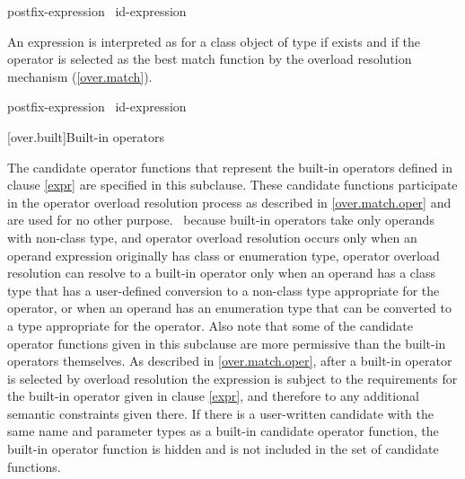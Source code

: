 \documentclass[american]{book}
\begin{document}
\begin{ncsimplebnf}
postfix-expression \terminal{->}\ id-expression
\end{ncsimplebnf}

An expression
is interpreted as
for a class object
of type
if
exists and if the operator is selected as the best match function by
the overload resolution mechanism (\ref{over.match}).

\pnum
{}%

\color{addclr}
\begin{ncsimplebnf}
postfix-expression \terminal{->}\ id-expression
\end{ncsimplebnf}
\color{black}


\setcounter{section}{5}
[over.built]{Built-in operators}

\pnum
The candidate operator functions that represent the built-in operators
defined in clause \ref{expr} are specified in this subclause.
These candidate
functions participate in the operator overload resolution process as
described in \ref{over.match.oper} and are used for no other purpose.
\enternote\ 
because built-in operators take only operands with non-class type,
and operator overload resolution occurs only when an operand expression
originally has class or enumeration type,
operator overload resolution can resolve to a built-in operator only
when an operand has a class type that has a user-defined conversion to
a non-class type appropriate for the operator, or when an operand has
an enumeration type that can be converted to a type appropriate
for the operator.
Also note that some of the candidate operator functions given in this subclause are
more permissive than the built-in operators themselves.
As
described in \ref{over.match.oper}, after a built-in operator is selected
by overload resolution the expression is subject to the requirements for
the built-in operator given in clause \ref{expr}, and therefore to any
additional semantic constraints given there.
If there is a user-written
candidate with the same name and parameter types as a built-in
candidate operator function, the built-in operator function
is hidden and is not included in the set of candidate functions.
\exitnote\ 
\end{document}

